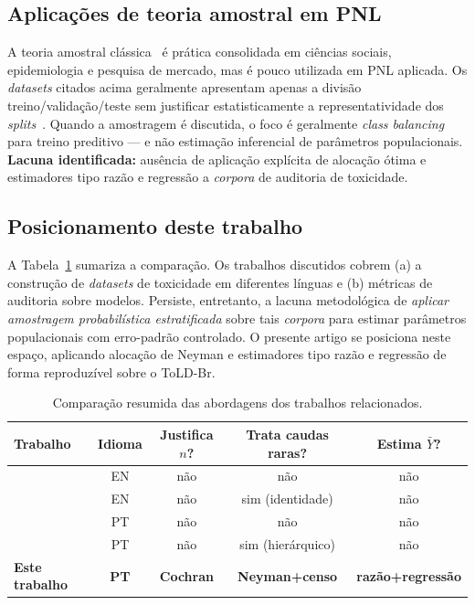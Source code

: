 \subsection{Aplicações de teoria amostral em PNL}

A teoria amostral
clássica~\cite{cochran1977,bolfarine2005,lohr1999,thompson2002,cordeiro2010}
é prática consolidada em ciências sociais, epidemiologia e pesquisa de
mercado, mas é pouco utilizada em PNL aplicada. Os \textit{datasets} citados
acima geralmente apresentam apenas a divisão treino/validação/teste sem
justificar estatisticamente a representatividade dos
\textit{splits}~\cite{leite2020,vargas2022hatebr,davidson2017}.
Quando a amostragem é discutida, o foco é geralmente \textit{class balancing}
para treino preditivo --- e não estimação inferencial de parâmetros
populacionais. \textbf{Lacuna identificada:} ausência de aplicação explícita
de alocação ótima e estimadores tipo razão e regressão a \textit{corpora} de
auditoria de toxicidade.

\subsection{Posicionamento deste trabalho}

A Tabela~\ref{tab:related-comparison} sumariza a comparação. Os trabalhos
discutidos cobrem (a) a construção de \textit{datasets} de toxicidade em
diferentes línguas e (b) métricas de auditoria sobre modelos. Persiste,
entretanto, a lacuna metodológica de \textit{aplicar amostragem
probabilística estratificada} sobre tais \textit{corpora} para estimar
parâmetros populacionais com erro-padrão controlado. O presente artigo se
posiciona neste espaço, aplicando alocação de Neyman e estimadores tipo
razão e regressão de forma reproduzível sobre o ToLD-Br.

\begin{table}[!t]
\centering
\small
\setlength{\tabcolsep}{8pt}
\caption{Comparação resumida das abordagens dos trabalhos relacionados.}
\label{tab:related-comparison}
\begin{tabular}{lcccc}
\toprule
Trabalho & Idioma & Justifica $n$? & Trata caudas raras? & Estima $\bar{Y}$? \\
\midrule
\cite{wulczyn2017}        & EN & não & não & não \\
\cite{borkan2019nuanced}  & EN & não & sim (identidade) & não \\
\cite{leite2020}          & PT & não & não & não \\
\cite{vargas2022hatebr}   & PT & não & sim (hierárquico) & não \\
\textbf{Este trabalho}    & \textbf{PT} & \textbf{Cochran} & \textbf{Neyman+censo} & \textbf{razão+regressão} \\
\bottomrule
\end{tabular}
\end{table}

